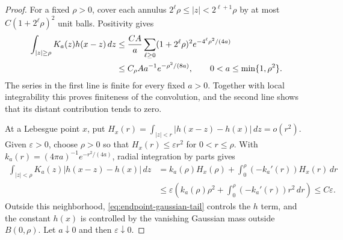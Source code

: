 \begin{proof}
For a fixed $\rho>0$, cover each annulus
$2^\ell\rho\le |z|<2^{\ell+1}\rho$ by at most
$C(1+2^\ell\rho)^2$ unit balls.  Positivity gives
\begin{align}
 \int_{|z|\ge\rho}K_a(z)h(x-z)\,dz
 &\le \frac{CA}{a}\sum_{\ell\ge0}(1+2^\ell\rho)^2
                       e^{-4^\ell\rho^2/(4a)}\notag\\
 &\le C_\rho A a^{-1}e^{-\rho^2/(8a)},
 \qquad 0<a\le\min\{1,\rho^2\}.
 \label{eq:endpoint-gaussian-tail}
\end{align}
The series in the first line is finite for every fixed $a>0$.  Together
with local integrability this proves finiteness of the convolution, and
the second line shows that its distant contribution tends to zero.

At a Lebesgue point $x$, put
$H_x(r)=\int_{|z|<r}|h(x-z)-h(x)|\,dz=o(r^2)$.
Given $\varepsilon>0$, choose $\rho>0$ so that
$H_x(r)\le\varepsilon r^2$ for $0<r\le\rho$.  With
$k_a(r)=(4\pi a)^{-1}e^{-r^2/(4a)}$, radial integration by parts gives
\begin{align*}
 \int_{|z|<\rho}K_a(z)|h(x-z)-h(x)|\,dz
 &=k_a(\rho)H_x(\rho)
       +\int_0^\rho(-k_a'(r))H_x(r)\,dr\\
 &\le\varepsilon\left(k_a(\rho)\rho^2
                  +\int_0^\rho(-k_a'(r))r^2\,dr\right)
 \le C\varepsilon.
\end{align*}
Outside this neighborhood, \eqref{eq:endpoint-gaussian-tail} controls
the $h$ term, and the constant $h(x)$ is controlled by the vanishing
Gaussian mass outside $B(0,\rho)$.  Let $a\downarrow0$ and then
$\varepsilon\downarrow0$.
\end{proof}

